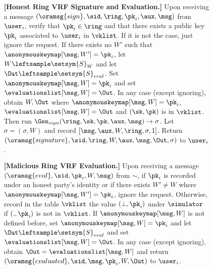 \begin{figure}
\begin{tcolorbox}[left=2pt,right=2pt]
{			%
			\textbf{[Honest Ring VRF Signature and Evaluation.]} Upon receiving a message $(\oramsg{sign}, \sid, \ring, \pk_i,\aux, \msg)$ from $\user_i$, verify that $\pk_i \in \ring$ and that there exists a public key $\pk_i$ associated to $\user_i$ in $ \vklist $. If it is not the case, just ignore the request. 	
			If there exists no $ W' $ such that $ \anonymouskeymap[\msg,W'] =  \pk_i $, let $ W \leftsample \setsym{S}_W $ and let $\Out \leftsample \setsym{S}_{eval}$. Set $ \anonymouskeymap[\msg,W] = \pk_i $ and set $ \evaluationslist[\msg, W] = \Out$.
			In any case (except ignoring), obtain $ W, \Out$ where $ \anonymouskeymap[\msg,W] =\pk_i $, $ \evaluationslist[\msg, W] = \Out$ and  $ (\sk, \pk) $ is in $\vklist $. Then run  $ \Gen_{sign}(\ring,\sk,\pk,\aux,\msg) \rightarrow \sigma $.
			Let $ \sigma = (\sigma,W)$ and record $ [\msg,\aux, W, \ring,\sigma, 1] $. Return $(\oramsg{signature}, \sid, \ring,W,\aux,\msg, \Out, \sigma)$ to $\user_i$.
			
			\textbf{[Malicious Ring VRF Evaluation.]}  Upon receiving a message $(\oramsg{eval}, \allowbreak \sid, \allowbreak \pk_i, \allowbreak W, \msg)$ from $\sim$, if $ \pk_i $ is recorded under an honest party's identity or if there exists $ W'\neq W $ where $ \anonymouskeymap[\msg,W'] = \pk_i $, ignore the request.
			Otherwise, record in the table $\vklist$ the value $(\perp,\pk_i)$ under $\simulator$ if $ (.,\pk_i) $ is not in $ \vklist $.
			If  $\anonymouskeymap[\msg,W]  $ is not defined before, set $ \anonymouskeymap[\msg,W] = \pk_i $ and let   $\Out \leftsample \setsym{S}_{eval}$ and set $ \evaluationslist[\msg, W] = \Out$.
			In any case (except ignoring), obtain $ \Out = \evaluationslist[\msg, W] $ and return $(\oramsg{evaluated}, \sid,  \msg, \pk_i,W, \Out)$ to $ \user_i $.
			
}
\end{tcolorbox}
\end{figure}
